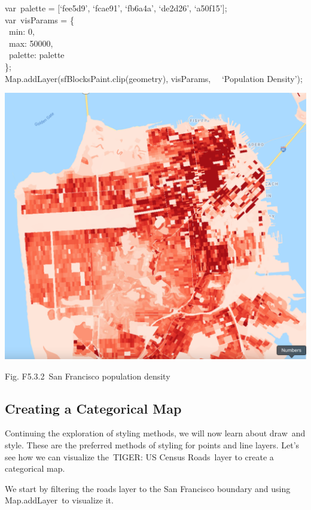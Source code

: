 \documentclass[
  letterpaper,
  DIV=11,
  numbers=noendperiod]{scrreprt}
\begin{document}
var~palette = {[}`fee5d9', `fcae91', `fb6a4a', `de2d26', `a50f15'{]};\\
var~visParams = \{\\
\hspace*{0.333em} ~min: 0,\\
\hspace*{0.333em} ~max: 50000,\\
\hspace*{0.333em} ~palette: palette\\
\};\\
Map.addLayer(sfBlocksPaint.clip(geometry), visParams,~ ~`Population
Density');

\includegraphics{./F5/image41.png}

Fig. F5.3.2~San Francisco population density

\hypertarget{creating-a-categorical-map}{%
\subsection{Creating a Categorical
Map}\label{creating-a-categorical-map}}

Continuing the exploration of styling methods, we will now learn about
draw~and style. These are the preferred methods of styling for points
and line layers. Let's see how we can visualize the~TIGER: US Census
Roads~layer to create a categorical map.

We start by filtering the roads layer to the San Francisco boundary and
using Map.addLayer~to visualize it.
\end{document}
